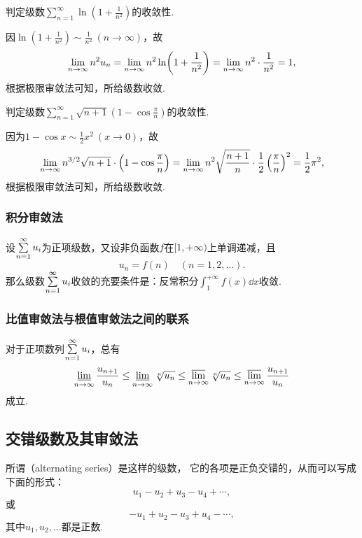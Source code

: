 \begin{example}
\def\s{\sum\limits_{n=1}^\infty }
判定级数\(\s \ln(1+\frac{1}{n^2})\)的收敛性.
\begin{solution}
因\(\ln(1+\frac{1}{n^2}) \sim \frac{1}{n^2}\ (n\to\infty)\)，故\[
\lim\limits_{n\to\infty} n^2 u_n = \lim\limits_{n\to\infty} n^2 \ln(1+\frac{1}{n^2})
= \lim\limits_{n\to\infty} n^2 \cdot \frac{1}{n^2} = 1,
\]根据极限审敛法可知，所给级数收敛.
\end{solution}
\end{example}

\begin{example}
\def\s{\sum\limits_{n=1}^\infty }
判定级数\(\s \sqrt{n+1} \left(1-\cos\frac{\pi}{n}\right)\)的收敛性.
\begin{solution}
因为\(1 - \cos x \sim \frac{1}{2} x^2\ (x\to0)\)，故\[
\lim\limits_{n\to\infty} n^{3/2} \sqrt{n+1} \cdot \left(1-\cos\frac{\pi}{n}\right)
= \lim\limits_{n\to\infty} n^2 \sqrt{\frac{n+1}{n}} \cdot \frac{1}{2} \left(\frac{\pi}{n}\right)^2
= \frac{1}{2} \pi^2,
\]根据极限审敛法可知，所给级数收敛.
\end{solution}
\end{example}

\subsubsection{积分审敛法}
\begin{theorem}[积分审敛法]\label{theorem:无穷级数.积分审敛法}
设\(\s u_i\)为正项级数，又设非负函数\(f\)在\([1,+\infty)\)上单调递减，且\[
u_n = f(n)
\quad(n=1,2,\dotsc).
\]那么级数\(\s u_i\)收敛的充要条件是：反常积分\(\int_1^{+\infty} f(x) \dd{x}\)收敛.
\end{theorem}

\subsubsection{比值审敛法与根值审敛法之间的联系}
\begin{theorem}
对于正项数列\(\s u_i\)，总有\[
\varliminf\limits_{n\to\infty} \frac{u_{n+1}}{u_n}
\leq
\varliminf\limits_{n\to\infty} \sqrt[n]{u_n}
\leq
\varlimsup\limits_{n\to\infty} \sqrt[n]{u_n}
\leq
\varlimsup\limits_{n\to\infty} \frac{u_{n+1}}{u_n}
\]成立.
\end{theorem}

\subsection{交错级数及其审敛法}
所谓（alternating series）是这样的级数，
它的各项是正负交错的，从而可以写成下面的形式：\[
u_1 - u_2 + u_3 - u_4 + \dotsb,
\]或\[
-u_1 + u_2 - u_3 + u_4 - \dotsb,
\]其中\(u_1,u_2,\dotsc\)都是正数.

